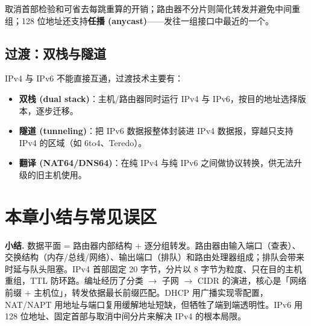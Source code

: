 \noindent 取消首部检验和可省去每跳重算的开销；路由器不分片则简化转发并避免中间重组；128 位地址还支持\textbf{任播 (anycast)}——发往一组接口中最近的一个。

\subsection{过渡：双栈与隧道}

IPv4 与 IPv6 不能直接互通，过渡技术主要有：

\begin{itemize}
    \item \textbf{双栈 (dual stack)}：主机/路由器同时运行 IPv4 与 IPv6，按目的地址选择版本，逐步迁移。
    \item \textbf{隧道 (tunneling)}：把 IPv6 数据报整体封装进 IPv4 数据报，穿越只支持 IPv4 的区域（如 6to4、Teredo）。
    \item \textbf{翻译 (NAT64/DNS64)}：在纯 IPv4 与纯 IPv6 之间做协议转换，供无法升级的旧主机使用。
\end{itemize}

\section{本章小结与常见误区}

\noindent\textbf{小结.} 数据平面 = 路由器内部结构 + 逐分组转发。路由器由输入端口（查表）、交换结构（内存/总线/网络）、输出端口（排队）和路由处理器组成；排队会带来时延与队头阻塞。IPv4 首部固定 20 字节，分片以 8 字节为粒度、只在目的主机重组，TTL 防环路。编址经历了分类 $\to$ 子网 $\to$ CIDR 的演进，核心是「网络前缀 + 主机位」，转发依据最长前缀匹配。DHCP 用广播实现零配置，NAT/NAPT 用地址与端口复用缓解地址短缺，但牺牲了端到端透明性。IPv6 用 128 位地址、固定首部与取消中间分片来解决 IPv4 的根本局限。

